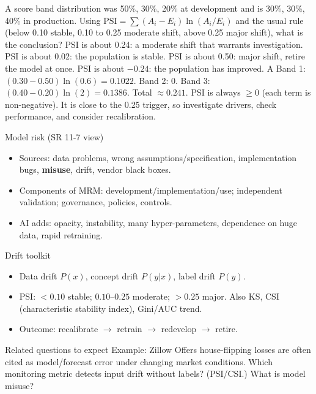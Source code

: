 {A score band distribution was 50\%, 30\%, 20\% at development and is 30\%, 30\%, 40\% in production. Using $\text{PSI}=\sum(A_i-E_i)\ln(A_i/E_i)$ and the usual rule (below 0.10 stable, 0.10 to 0.25 moderate shift, above 0.25 major shift), what is the conclusion?}
{PSI is about 0.24: a moderate shift that warrants investigation.}
{PSI is about 0.02: the population is stable.}
{PSI is about 0.50: major shift, retire the model at once.}
{PSI is about $-0.24$: the population has improved.}
{A}
{Band 1: $(0.30-0.50)\ln(0.6)=0.1022$. Band 2: 0. Band 3: $(0.40-0.20)\ln(2)=0.1386$. Total $\approx0.241$. PSI is always $\ge0$ (each term is non-negative). It is close to the 0.25 trigger, so investigate drivers, check performance, and consider recalibration.}

{\begin{block}{Model risk (SR 11-7 view)}
		\begin{itemize}
			\item Sources: data problems, wrong assumptions/specification, implementation bugs, \textbf{misuse}, drift, vendor black boxes.
			\item Components of MRM: development/implementation/use; independent validation; governance, policies, controls.
			\item AI adds: opacity, instability, many hyper-parameters, dependence on huge data, rapid retraining.
\end{itemize}\end{block}}
{\begin{block}{Drift toolkit}
		\begin{itemize}
			\item Data drift $P(x)$, concept drift $P(y|x)$, label drift $P(y)$.
			\item PSI: $<0.10$ stable; $0.10$--$0.25$ moderate; $>0.25$ major. Also KS, CSI (characteristic stability index), Gini/AUC trend.
			\item Outcome: recalibrate $\rightarrow$ retrain $\rightarrow$ redevelop $\rightarrow$ retire.
	\end{itemize}\end{block}
	\begin{alertblock}{Related questions to expect}
		Example: Zillow Offers house-flipping losses are often cited as model/forecast error under changing market conditions. Which monitoring metric detects input drift without labels? (PSI/CSI.) What is model misuse?
\end{alertblock}}

